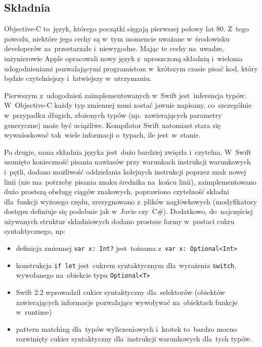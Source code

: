 \documentclass[mgr, shortabstract]{iithesis}
\begin{document}
\subsection{Składnia}

Objective-C to~język, którego początki sięgają pierwszej połowy lat 80. Z~tego powodu, niektóre jego cechy są w~tym momencie uważane w~środowisku developerów za~przestarzałe i~niewygodne. Mając te cechy na~uwadze, inżynierowie Apple opracowali nowy język z~uproszczoną składnią i~wieloma udogodnieniami pozwalającymi programistom w~krótszym czasie pisać kod, który będzie czytelniejszy i~łatwiejszy w~utrzymaniu.

Pierwszym z~udogodnień zaimplementowanych w~Swift jest~inferencja typów. W~Objective-C każdy typ zmiennej musi zostać jawnie napisany, co~szczególnie w~przypadku długich, złożonych typów (np.~zawierających parametry generyczne) może być uciążliwe. Kompilator Swift natomiast stara się wywnioskować tak~wiele informacji o~typach, ile jest~w~stanie.

Po drugie, sama składnia języka jest~dużo bardziej zwięzła i~czytelna. W~Swift usunięto konieczność pisania nawiasów przy warunkach instrukcji warunkowych i~pętli, dodano możliwość oddzielania kolejnych instrukcji poprzez znak nowej linii (nie ma~potrzeby pisania znaku średnika na~końcu linii), zaimplementowano dużo prostszą obsługę ciągów znakowych, poprawiono czytelność składni dla~funkcji wyższego rzędu, zrezygnowano z~plików nagłówkowych (modyfikatory dostępu definiuje się podobnie jak w~Javie czy~C\#). Dodatkowo, do~najczęściej używanych struktur składniowych dodano prostsze formy w~postaci cukru syntaktycznego, np:

\begin{itemize}
    \item definicja zmiennej \texttt{var x: Int?} jest~tożsama z~\texttt{var x: Optional<Int>}
    \item konstrukcja \texttt{if let} jest~cukrem syntaktycznym dla~wyrażenia \texttt{switch}, wywołanego na~obiekcie typu \texttt{Optional<T>}
    \item Swift 2.2 wprowadził cukier syntaktyczny dla~selektorów (obiektów zawierających informacje pozwalające wywoływać na~obiektach funkcje w~runtime)
    \item pattern matching dla~typów wyliczeniowych i~krotek to~bardzo mocno rozwinięty cukier syntaktyczny dla~instrukcji warunkowych dla~tych typów.
\end{itemize}
\end{document}
